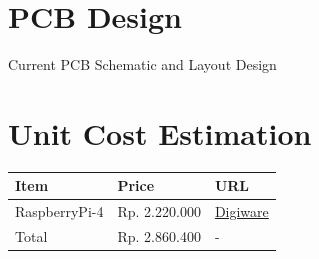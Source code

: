 \documentclass[a4paper,12pt,oneside,pdflatex,italian,final,twocolumn]{article}
\begin{document}
	\raggedright
	\section{PCB Design}

	Current PCB Schematic and Layout Design
	
	\newpage
	
	
	\newpage
	
	
	\newpage
	
	
	\newpage
	\section{Unit Cost Estimation}
	
	\begin{tabular}{|l|l|l|}
		\toprule
		Item & Price & URL \\
		\midrule
		RaspberryPi-4 & Rp. 2.220.000 & \href{https://digiwarestore.com/en/raspberry-board/raspberry-pi-4-ram-2gb-made-in-uk-mini-pc-raspi-4-442339.html}{Digiware} \\
		\midrule
		Total & Rp. 2.860.400 & - \\
		\bottomrule
	\end{tabular}
\end{document}
